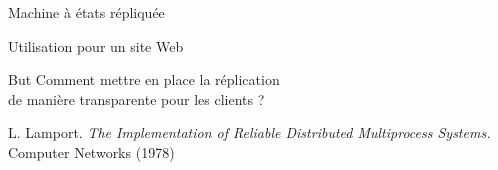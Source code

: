 \begin{frame}{Machine à états répliquée}
\begin{exampleblock}{Utilisation pour un site Web}
  \end{exampleblock}

  \vspace{-1mm}
  \begin{block}{But}
    \centering
    \vspace{-3mm}
    \alert{Comment mettre en place la réplication \\ de manière transparente pour les clients ?}
  \end{block}
  
  \begin{citing}
  \item L. Lamport. \emph{The Implementation of Reliable Distributed Multiprocess Systems.} Computer Networks (1978)
  \end{citing}

\end{frame}

\endgroup
\endinput
